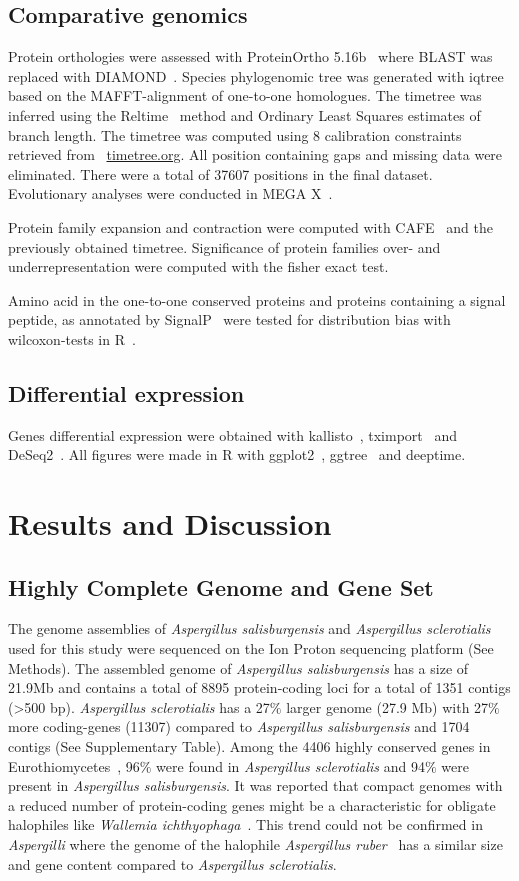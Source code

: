 \documentclass[jof,article,submit,moreauthors,pdftex,10pt,a4paper]{Definitions/mdpi}
\newcommand{\aspRub}{\textit{Aspergillus ruber}}
\newcommand{\walIch}{\textit{Wallemia ichthyophaga}}
\newcommand{\phiSp}{\textit{Aspergillus salisburgensis}}
\newcommand{\phiScl}{\textit{Aspergillus sclerotialis}}
\begin{document}
\subsection{Comparative genomics}
Protein orthologies were assessed with 
ProteinOrtho 5.16b~\cite{Lechner2011} where BLAST was replaced with DIAMOND~\cite{Buchfink2015}.
Species phylogenomic tree was generated with iqtree~\cite{Nguyen2015,Minh2013,Kalyaanamoorthy2017} based on the MAFFT-alignment of one-to-one homologues. The timetree was inferred using the Reltime~\cite{Tamura2012,Tamura2018} method and Ordinary Least Squares estimates of branch length. The timetree was computed using 8 calibration constraints retrieved from ~\url{timetree.org}. All position containing gaps and missing data were eliminated. There were a total of 37607 positions in the final dataset. Evolutionary analyses were conducted in MEGA X~\cite{Kumar2018}.

Protein family expansion and contraction were computed with CAFE~\cite{DeBie2006} and the previously obtained timetree. Significance of protein families over- and underrepresentation were computed with the fisher exact test. 

Amino acid in the one-to-one conserved proteins and proteins containing a signal peptide, as annotated by SignalP~\cite{Almagro2019} were tested for distribution bias with wilcoxon-tests in R~\cite{RCoreTeam2016}. 

\subsection{Differential expression}
Genes differential expression were obtained with kallisto~\cite{Bray2016}, tximport~\cite{Soneson2016} and DeSeq2~\cite{Love2014}. All figures were made in R with ggplot2~\cite{Wickham2008}, ggtree~\cite{Yu2017} and deeptime.



\section{Results and Discussion}
\subsection{Highly Complete Genome and Gene Set}
The genome assemblies of {\phiSp} and {\phiScl} used for this study
were sequenced on the Ion Proton sequencing platform (See Methods). The assembled genome of {\phiSp} has a size of 21.9Mb and contains a total of 8895 protein-coding loci for a total of 1351 contigs (>500 bp). {\phiScl} has a 27$\%$ larger genome (27.9 Mb) with 27$\%$ more
coding-genes (11307) compared to {\phiSp} and 1704 contigs (See Supplementary Table). 
Among the 4406 highly conserved genes in Eurothiomycetes~\cite{Simao2015}, 96$\%$ were found in \phiScl{} and 94$\%$ were present in \phiSp{}.  It was reported that compact genomes with a reduced number of protein-coding genes might be a characteristic for obligate halophiles like \walIch{}~\cite{Plemenitas2014}. This trend could not be confirmed in \textit{Aspergilli} where the genome of the halophile \aspRub{}~\cite{Kis-Papo2014-dn} has a similar size and gene content compared to \phiScl{}.    
\end{document}

